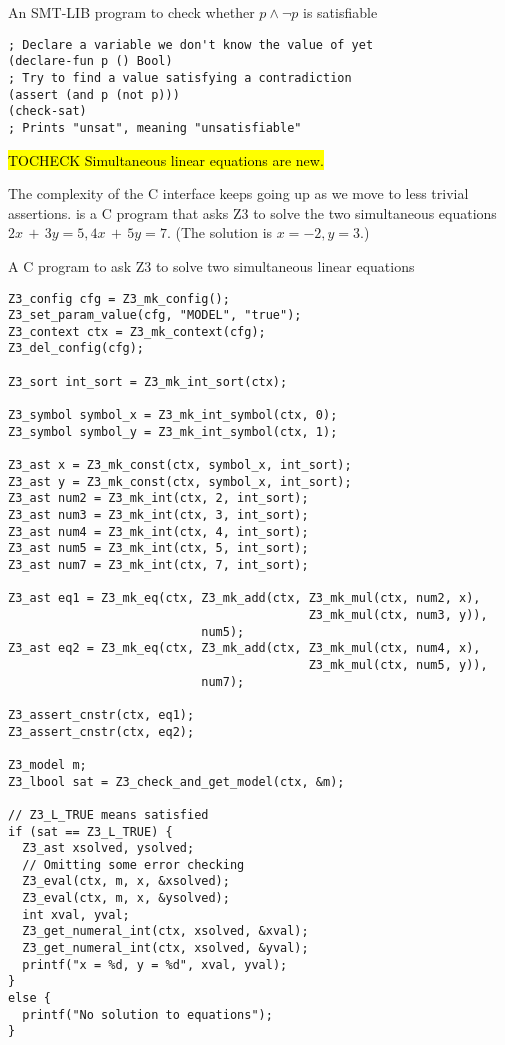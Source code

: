 \begin{program}
\caption{An SMT-LIB program to check whether $p \wedge \neg p$ is satisfiable}
\label{fig:smtlib-prop}
\begin{verbatim}
; Declare a variable we don't know the value of yet
(declare-fun p () Bool)
; Try to find a value satisfying a contradiction
(assert (and p (not p)))
(check-sat)
; Prints "unsat", meaning "unsatisfiable"
\end{verbatim}
\end{program}

\hl{TOCHECK Simultaneous linear equations are new.}

The complexity of the C interface keeps going up as we move to less trivial
assertions.  is a C program that asks Z3 to solve the
two simultaneous equations $2x\,+\,3y = 5, 4x\,+\,5y = 7$. (The solution is $x =
-2, y = 3$.)

\begin{program}
\caption{A C program to ask Z3 to solve two simultaneous linear equations}
\label{fig:c-simultaneous}
\begin{verbatim}
Z3_config cfg = Z3_mk_config();
Z3_set_param_value(cfg, "MODEL", "true");
Z3_context ctx = Z3_mk_context(cfg);
Z3_del_config(cfg);

Z3_sort int_sort = Z3_mk_int_sort(ctx);

Z3_symbol symbol_x = Z3_mk_int_symbol(ctx, 0);
Z3_symbol symbol_y = Z3_mk_int_symbol(ctx, 1);

Z3_ast x = Z3_mk_const(ctx, symbol_x, int_sort);
Z3_ast y = Z3_mk_const(ctx, symbol_x, int_sort);
Z3_ast num2 = Z3_mk_int(ctx, 2, int_sort);
Z3_ast num3 = Z3_mk_int(ctx, 3, int_sort);
Z3_ast num4 = Z3_mk_int(ctx, 4, int_sort);
Z3_ast num5 = Z3_mk_int(ctx, 5, int_sort);
Z3_ast num7 = Z3_mk_int(ctx, 7, int_sort);

Z3_ast eq1 = Z3_mk_eq(ctx, Z3_mk_add(ctx, Z3_mk_mul(ctx, num2, x),
                                          Z3_mk_mul(ctx, num3, y)),
                           num5);
Z3_ast eq2 = Z3_mk_eq(ctx, Z3_mk_add(ctx, Z3_mk_mul(ctx, num4, x),
                                          Z3_mk_mul(ctx, num5, y)),
                           num7);

Z3_assert_cnstr(ctx, eq1);
Z3_assert_cnstr(ctx, eq2);

Z3_model m;
Z3_lbool sat = Z3_check_and_get_model(ctx, &m);

// Z3_L_TRUE means satisfied
if (sat == Z3_L_TRUE) {
  Z3_ast xsolved, ysolved;
  // Omitting some error checking
  Z3_eval(ctx, m, x, &xsolved);
  Z3_eval(ctx, m, x, &ysolved);
  int xval, yval;
  Z3_get_numeral_int(ctx, xsolved, &xval);
  Z3_get_numeral_int(ctx, xsolved, &yval);
  printf("x = %d, y = %d", xval, yval);
}
else {
  printf("No solution to equations");
}
\end{verbatim}
\end{program}

